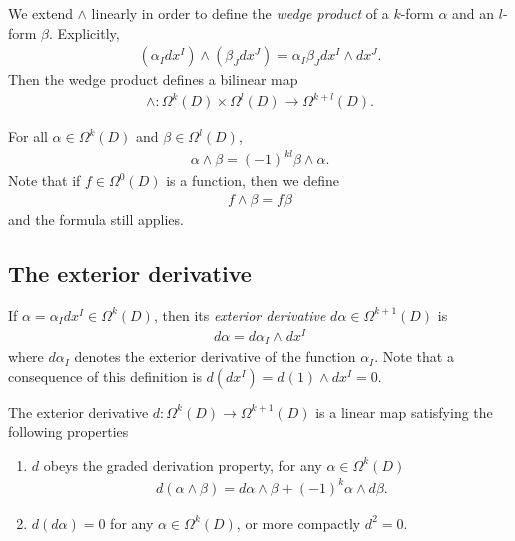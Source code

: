 \documentclass{article}
\begin{document}
\begin{definition}
    We extend $\wedge$ linearly in order to define the \emph{wedge product} of a $k$-form $\alpha$
    and an $l$-form $\beta$. Explicitly,
    \begin{align*}
        (\alpha_Idx^I) \wedge (\beta_Jdx^J) = \alpha_I\beta_Jdx^I\wedge dx^J.
    \end{align*}
    Then the wedge product defines a bilinear map 
    \begin{align*}
        \wedge : \Omega^k(D) \times \Omega^l(D) \to \Omega^{k+l} (D).
    \end{align*}
\end{definition}

\begin{proposition}
    For all $\alpha\in\Omega^k(D)$ and $\beta\in\Omega^l(D)$,
    \begin{align*}
        \alpha\wedge\beta = (-1)^{kl} \beta \wedge \alpha.
    \end{align*}
    Note that if $f\in\Omega^0(D)$ is a function, then we define 
    \begin{align*}
        f\wedge\beta = f\beta
    \end{align*}
    and the formula still applies.
\end{proposition}

\subsection{The exterior derivative}

\begin{definition}
    If $\alpha=\alpha_Idx^I\in\Omega^k(D)$, then its \emph{exterior derivative} $d\alpha\in\Omega^{k+1}(D)$
    is 
    \begin{align*}
        d\alpha = d\alpha_I \wedge dx^I
    \end{align*}
    where $d\alpha_I$ denotes the exterior derivative of the function $\alpha_I$. Note that 
    a consequence of this definition is $d(dx^I) = d(1)\wedge dx^I=0$.
\end{definition}

\begin{theorem}
    The exterior derivative $d:\Omega^k(D)\to \Omega^{k+1}(D)$ is a linear map satisfying
    the following properties 
    \begin{enumerate}
        \item $d$ obeys the graded derivation property, for any $\alpha\in\Omega^k(D)$ \begin{align*}
            d(\alpha \wedge \beta) = d\alpha\wedge\beta +(-1)^k\alpha\wedge d\beta.
        \end{align*}
        \item $d(d\alpha)=0$ for any $\alpha\in\Omega^k(D)$, or more compactly $d^2=0$.
    \end{enumerate}
\end{theorem}
\end{document}
